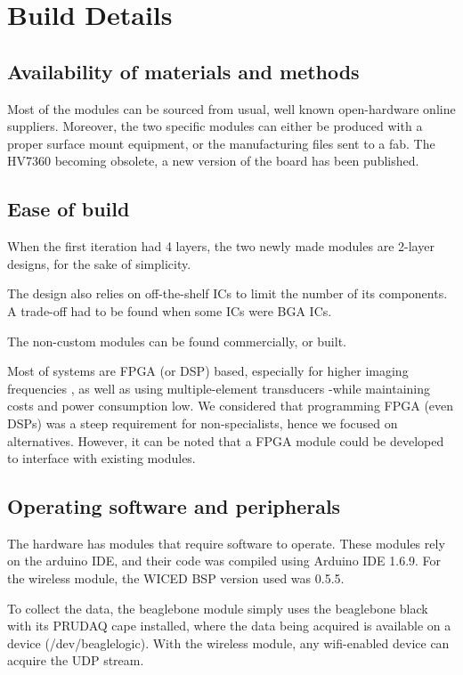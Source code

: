 \documentclass[letterpaper, 10 pt, conference]{ieeeconf} %
\begin{document}
\section{Build Details}

\subsection{Availability of materials and methods}

Most of the modules can be sourced from usual, well known open-hardware online suppliers. Moreover, the two specific modules can either be produced with a proper surface mount equipment, or the manufacturing files sent to a fab. The HV7360 becoming obsolete, a new version of the board has been published.

\subsection{ Ease of build}

When the first iteration had 4 layers, the two newly made modules are 2-layer designs, for the sake of simplicity.

The design also relies on off-the-shelf ICs to limit the number of its components. A trade-off had to be found when some ICs were BGA ICs.

The non-custom modules can be found commercially, or built.

Most of systems are FPGA (or DSP) based, especially for higher imaging frequencies \cite{c4,c5}, as well as using multiple-element transducers \cite{c7} -while maintaining costs and power consumption low. We considered that programming FPGA (even DSPs) was a steep requirement for non-specialists, hence we focused on alternatives. However, it can be noted that a FPGA module could be developed to interface with existing modules. 

\subsection{ Operating software and peripherals}

The hardware has modules that require software to operate. These modules rely on the arduino IDE, and their code was compiled using Arduino IDE 1.6.9. For the wireless module, the WICED BSP version used was 0.5.5.

To collect the data, the beaglebone module simply uses the beaglebone black with its PRUDAQ cape installed, where the data being acquired is available on a device (/dev/beaglelogic). With the wireless module, any wifi-enabled device can acquire the UDP stream. 
\end{document}
